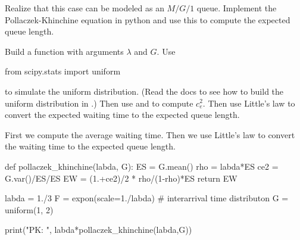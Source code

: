 \begin{exercise}\label{ex:5}
  Realize that this case can be modeled as an $M/G/1$ queue.
  Implement the Pollaczek-Khinchine equation in python and use this to compute the expected queue length.

  
  \begin{hint}
    Build a function with arguments $\lambda$ and $G$. Use
    \begin{pyverbatim}
from scipy.stats import uniform
    \end{pyverbatim}
to simulate the uniform distribution. (Read the docs to see how to build the uniform distribution in .) Then use  and  to compute $c_e^2$.  Then use Little's law to convert the expected waiting time to the expected queue length. 
  \end{hint}
  \begin{solution}

First we compute the average waiting time.  Then we use Little's law to convert the waiting time to the expected queue length.

    \begin{pyverbatim}

def pollaczek_khinchine(labda, G):
    ES = G.mean()
    rho = labda*ES
    ce2 = G.var()/ES/ES
    EW = (1.+ce2)/2 * rho/(1-rho)*ES
    return EW

    
labda = 1./3
F = expon(scale=1./labda)  # interarrival time distributon
G = uniform(1, 2)

print("PK: ", labda*pollaczek_khinchine(labda,G))
      
    \end{pyverbatim}

  \end{solution}

\end{exercise}

